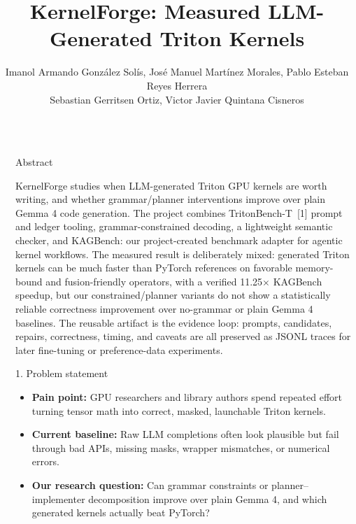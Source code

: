 \documentclass[final]{beamer}
\title{KernelForge: Measured LLM-Generated Triton Kernels}
\author[KernelForge Team]{Imanol Armando González Solís, José Manuel Martínez Morales, Pablo Esteban Reyes Herrera\texorpdfstring{\\[-0.2ex]}{, }
Sebastian Gerritsen Ortiz, Victor Javier Quintana Cisneros}
\institute[shortinst]{Tecnológico de Monterrey — TC3002B (ACA-2026)}
\newlength{\sepwidth}
\newlength{\colwidth}
\newcommand{\separatorcolumn}{\begin{column}{\sepwidth}\end{column}}
\begin{document}
\begin{frame}[t]
\begin{columns}[t]
\separatorcolumn

\begin{column}{\colwidth}

  \begin{block}{Abstract}

    KernelForge studies when LLM-generated Triton GPU kernels are worth writing,
    and whether grammar/planner interventions improve over plain Gemma 4 code
    generation. The project combines TritonBench-T~[1] prompt and ledger tooling,
    grammar-constrained decoding, a lightweight semantic checker, and KAGBench:
    our project-created benchmark adapter for agentic kernel workflows. The measured result is deliberately
    mixed: generated Triton kernels can be much faster than PyTorch references on
    favorable memory-bound and fusion-friendly operators, with a verified
    11.25\(\times\) KAGBench speedup, but our constrained/planner variants do not
    show a statistically reliable correctness improvement over no-grammar or
    plain Gemma 4 baselines. The reusable artifact is the evidence loop: prompts,
    candidates, repairs, correctness, timing, and caveats are all preserved as
    JSONL traces for later fine-tuning or preference-data experiments.

  \end{block}

  \begin{block}{1. Problem statement}

    \begin{itemize}
      \item \textbf{Pain point:} GPU researchers and library authors spend repeated effort turning tensor math into correct, masked, launchable Triton kernels.
      \item \textbf{Current baseline:} Raw LLM completions often look plausible but fail through bad APIs, missing masks, wrapper mismatches, or numerical errors.
      \item \textbf{Our research question:} Can grammar constraints or planner--implementer decomposition improve over plain Gemma 4, and which generated kernels actually beat PyTorch?
    \end{itemize}

  \end{block}


\end{column}
\end{columns}
\end{frame}
\end{document}
